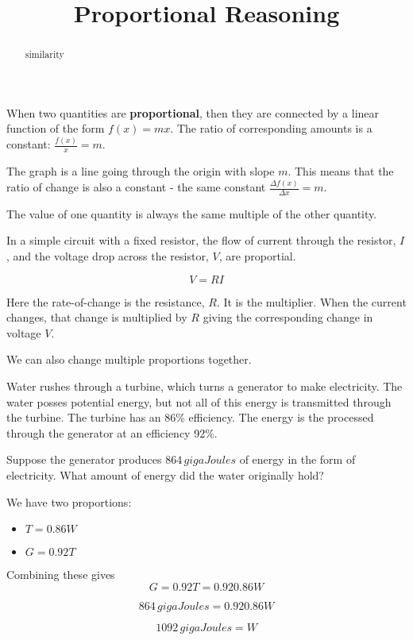 \documentclass{ximera}
\title{Proportional Reasoning}
\begin{document}
\begin{abstract}
similarity
\end{abstract}
\maketitle



When two quantities are \textbf{proportional}, then they are connected by a linear function of the form $f(x) = m x$.  The ratio of corresponding amounts is a constant: $\frac{f(x)}{x} = m$.   

The graph is a line going through the origin with slope $m$.  This means that the ratio of change is also a constant - the same constant $\frac{\Delta f(x)}{\Delta x} = m$. 

The value of one quantity is always the same multiple of the other quantity.




\begin{example}
In a simple circuit with a fixed resistor, the flow of current through the resistor, $I$, and the voltage drop across the resistor, $V$, are proportial.

\[   V = R I  \]

Here the rate-of-change is the resistance, $R$.  It is the multiplier.   When the current changes, that change is multiplied by $R$ giving the corresponding change in voltage $V$.


\end{example}







We can also change multiple proportions together.



\begin{example}

Water rushes through a turbine, which turns a generator to make electricity. The water posses potential energy, but not all of this energy is transmitted through the turbine.  The turbine has an 86\% efficiency. The energy is the processed through the generator at an efficiency 92\%.

Suppose the generator produces $864 \, gigaJoules$ of energy in the form  of electricity.  What amount of energy did the water originally hold?


We have two proportions:

\begin{itemize}
\item $T = 0.86 W$
\item $G = 0.92 T$
\end{itemize} 

Combining these gives 
\[   G = 0.92 T = 0.92 0.86 W   \]

\[   864 \, gigaJoules = 0.92 0.86 W    \]


\[   1092 \, gigaJoules = W    \]





\end{example}
\end{document}
